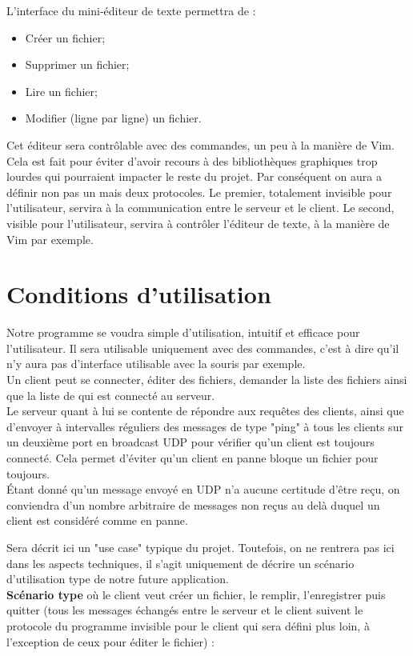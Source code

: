 \documentclass[14pt]{article}
\begin{document}
L'interface du mini-éditeur de texte permettra de :
\begin{itemize}
\item Créer un fichier;
\item Supprimer un fichier;
\item Lire un fichier;
\item Modifier (ligne par ligne) un fichier.\\
\end{itemize}
Cet éditeur sera contrôlable avec des commandes, un peu à la manière de Vim. Cela est fait pour éviter d'avoir recours à des bibliothèques graphiques trop lourdes qui pourraient impacter le reste du projet.
Par conséquent on aura a définir non pas un mais deux protocoles. Le premier, totalement invisible pour l'utilisateur, servira à la communication entre le serveur et le client. Le second, visible pour l'utilisateur, servira à contrôler l'éditeur de texte, à la manière de Vim par exemple.

\section{Conditions d'utilisation}
Notre programme se voudra simple d'utilisation, intuitif et efficace pour l'utilisateur. Il sera utilisable uniquement avec des commandes, c'est à dire qu'il n'y aura pas d'interface utilisable avec la souris par exemple.\\

Un client peut se connecter, éditer des fichiers, demander la liste des fichiers ainsi que la liste de qui est connecté au serveur.\\
Le serveur quant à lui se contente de répondre aux requêtes des clients, ainsi que d'envoyer à intervalles réguliers des messages de type "ping" à tous les clients sur un deuxième port en broadcast UDP pour vérifier qu'un client est toujours connecté. Cela permet d'éviter qu'un client en panne bloque un fichier pour toujours.\\
\'Etant donné qu'un message envoyé en UDP n'a aucune certitude d'être reçu, on conviendra d'un nombre arbitraire de messages non reçus au delà duquel un client est considéré comme en panne.

Sera décrit ici un "use case" typique du projet. Toutefois, on ne rentrera pas ici dans les aspects techniques, il s'agit uniquement de décrire un scénario d'utilisation type de notre future application.\\

\textbf{Scénario type} où le client veut créer un fichier, le remplir, l'enregistrer puis quitter (tous les messages échangés entre le serveur et le client suivent le protocole du programme invisible pour le client qui sera défini plus loin, à l'exception de ceux pour éditer le fichier) :
\end{document}
